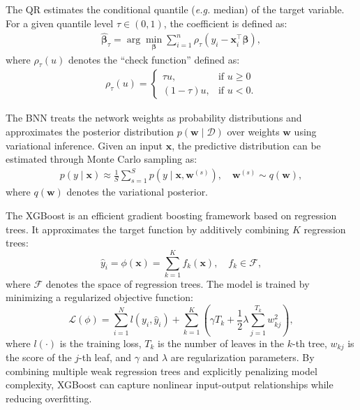 \documentclass[conference]{IEEEtran}
\begin{document}
The \gls{QR} estimates the conditional quantile (\emph{e.g.} median) of the target variable. For a given quantile level $\tau \in (0, 1)$, the coefficient is defined as:
\begin{align}
\hat{\boldsymbol{\beta}}_\tau = \arg\min_{\boldsymbol{\beta}} \sum_{i=1}^n \rho_\tau \left( y_i - \mathbf{x}_i^\top \boldsymbol{\beta} \right),
\end{align}
where $\rho_\tau(u)$ denotes the ``check function'' \cite{pinball_loss} defined as:
\begin{align}
\rho_\tau(u) =
\begin{cases}
\tau u, & \text{if } u \geq 0 \\
(1 - \tau) u, & \text{if } u < 0.
\end{cases}
\end{align}

The \gls{BNN} treats the network weights as probability distributions and approximates the posterior distribution $p(\mathbf{w} \mid \mathcal{D})$ over weights $\mathbf{w}$ using variational inference. Given an input $\mathbf{x}$, the predictive distribution can be estimated through Monte Carlo sampling as:
\begin{align}
p(y \mid \mathbf{x}) \approx \frac{1}{S} \sum_{s=1}^{S} p(y \mid \mathbf{x}, \mathbf{w}^{(s)}), \quad \mathbf{w}^{(s)} \sim q(\mathbf{w}),
\end{align}
where $q(\mathbf{w})$ denotes the variational posterior.

The XGBoost is an efficient gradient boosting framework based on regression trees. It approximates the target function by additively combining $K$ regression trees:
\begin{equation}
\hat{y}_i = \phi(\mathbf{x}) = \sum_{k=1}^{K} f_k(\mathbf{x}),
\quad f_k \in \mathcal{F},
\end{equation}
where \(\mathcal{F}\) denotes the space of regression trees. 
The model is trained by minimizing a regularized objective function:
\begin{equation}
\mathcal{L}(\phi)
=
\sum_{i=1}^{N} l(y_i,\hat{y}_i)
+
\sum_{k=1}^{K}
\left(
\gamma T_k
+
\frac{1}{2}\lambda
\sum_{j=1}^{T_k} w_{kj}^{2}
\right),
\end{equation}
where \(l(\cdot)\) is the training loss, \(T_k\) is the number of leaves in the \(k\)-th tree, \(w_{kj}\) is the score of the \(j\)-th leaf, and \(\gamma\) and \(\lambda\) are regularization parameters. 
By combining multiple weak regression trees and explicitly penalizing model complexity, XGBoost can capture nonlinear input-output relationships while reducing overfitting.
\end{document}

